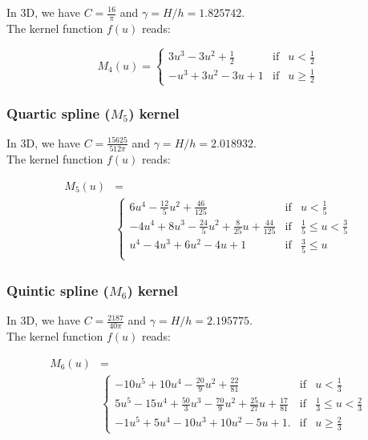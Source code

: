 In 3D, we have $C=\frac{16}{\pi}$ and $\gamma=H/h = 1.825742$.\\
The kernel function $f(u)$ reads:

\begin{equation}
  M_4(u) = \left\lbrace\begin{array}{rcl}
  3u^3 - 3u^2 + \frac{1}{2} & \mbox{if} & u<\frac{1}{2}\\
  -u^3 + 3u^2 - 3u + 1 & \mbox{if} & u \geq \frac{1}{2}
  \end{array}
  \right.
    \nonumber
\end{equation}


\subsubsection{Quartic spline ($M_5$) kernel}

In 3D, we have $C=\frac{15625}{512\pi}$ and $\gamma=H/h = 2.018932$.\\
The kernel function $f(u)$ reads:

\begin{align}
  M_5(u) &=     \nonumber\\
  &\left\lbrace\begin{array}{rcl}
  6u^4 - \frac{12}{5}u^2 + \frac{46}{125} & \mbox{if} & u < \frac{1}{5} \\
  -4u^4 + 8u^3  - \frac{24}{5}u^2 + \frac{8}{25}u + \frac{44}{125} &  \mbox{if} &  \frac{1}{5} \leq u < \frac{3}{5}\\
  u^4 - 4u^3 + 6u^2 - 4u + 1 &  \mbox{if} &  \frac{3}{5} \leq u \\
  \end{array}
  \right.
  \nonumber
\end{align}


\subsubsection{Quintic spline ($M_6$) kernel}

In 3D, we have $C=\frac{2187}{40\pi}$ and $\gamma=H/h = 2.195775$.\\
The kernel function $f(u)$ reads:

\begin{align}
  M_6(u) &=     \nonumber\\
  &\left\lbrace\begin{array}{rcl}
  -10u^5 + 10u^4 - \frac{20}{9}u^2 + \frac{22}{81} & \mbox{if} & u < \frac{1}{3} \\
  5u^5 - 15u^4 + \frac{50}{3}u^3 - \frac{70}{9}u^2 + \frac{25}{27}u + \frac{17}{81} &  \mbox{if} &  \frac{1}{3} \leq u < \frac{2}{3}\\
  -1u^5 + 5u^4 - 10u^3 + 10u^2 - 5u + 1. & \mbox{if} & u \geq \frac{2}{3}
  \end{array}
  \right.
      \nonumber
\end{align}


